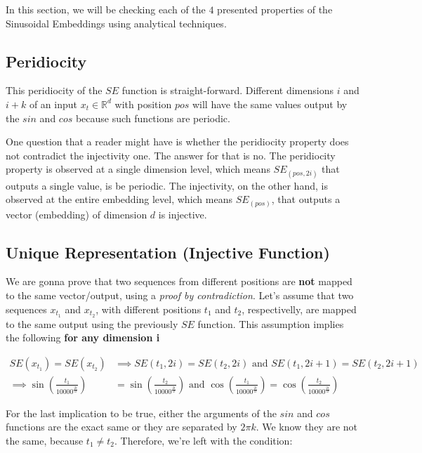 \documentclass{article}
\begin{document}
In this section, we will be checking each of the $4$ presented properties of the Sinusoidal Embeddings using analytical techniques.


\subsection{Peridiocity}

This peridiocity of the $SE$ function is straight-forward. Different dimensions $i$ and $i+k$ of an input  $x_t \in \mathbb{R}^{d}$ with position $pos$ will have the same values output by the $sin$ and $cos$ because such functions are periodic. 

\begin{info} %
	One question that a reader might have is whether the peridiocity property does not contradict the injectivity one. The answer for that is no. The peridiocity property is observed at a single dimension level, which means $SE_{(pos, 2i)}$ that outputs a single value, is be periodic. The injectivity, on the other hand, is observed at the entire embedding level, which means $SE_{(pos)}$, that outputs a vector (embedding) of dimension $d$ is injective.
\end{info}


\subsection{Unique Representation (Injective Function)}

We are gonna prove that two sequences from different positions are \textbf{not} mapped to the same vector/output, using a \textit{proof by contradiction}. 
Let's assume that two sequences $x_{t_1}$ and $x_{t_2}$, with different positions $t_1$ and $t_2$, respectivelly, are mapped to the same output using the previously  $SE$ function. This assumption implies the following \textbf{for any dimension i}

\begin{align}
	SE(x_{t_1}) = SE(x_{t_2}) & \implies SE(t_1, 2i) = SE(t_2, 2i) \text{   and   }SE(t_1, 2i+1) = SE(t_2, 2i+1) \\
	 \implies \sin\left(\frac{t_1}{10000^{\frac{2i}{d}}}\right) &= \sin\left(\frac{t_2}{10000^{\frac{2i}{d}}}\right) \text{   and   }\cos\left(\frac{t_1}{10000^{\frac{2i}{d}}}\right) = \cos\left(\frac{t_2}{10000^{\frac{2i}{d}}}\right) 
\end{align}


For the last implication to be true, either the arguments of the $sin$ and $cos$ functions are the exact same or they are separated by $2\pi k$. We know they are not the same, because $t_1 \neq t_2$. Therefore, we're left with the condition:
\end{document}
